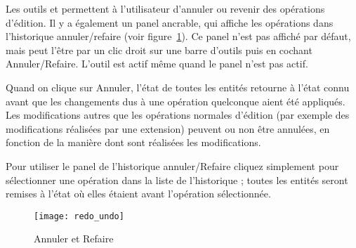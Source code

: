 Les outils  et  
permettent à l'utilisateur d'annuler ou revenir des opérations d'édition. Il y a 
également un panel ancrable, qui affiche les opérations dans l'historique annuler/refaire
(voir figure~\ref{fig:vector_redoundo}). Ce panel n'est pas affiché par défaut, 
mais peut l'être  par un clic droit sur une barre d'outils puis en cochant 
Annuler/Refaire. L'outil est actif même quand le panel n'est pas actif.
\par
Quand on clique sur Annuler, l'état de toutes les entités retourne à l'état 
connu avant que les changements dus à une opération quelconque aient été appliqués. 
Les modifications autres que les opérations normales d'édition (par exemple des 
modifications réalisées par une extension) peuvent ou non être annulées, en fonction 
de la manière dont sont réalisées les modifications.
\par
Pour utiliser le panel de l'historique annuler/Refaire  cliquez simplement pour 
sélectionner une opération dans la liste de l'historique ; toutes les entités 
seront remises à l'état où elles étaient avant l'opération sélectionnée.

\begin{figure}[ht]
   \begin{center}   
   \texttt{[image: redo\_undo]}
   \caption{Annuler et Refaire \nixcaption}\label{fig:vector_redoundo}
\end{center}
\end{figure}


